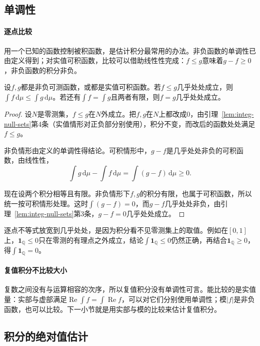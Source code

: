 \subsection{单调性}
\label{sec:integ-monotonicity}

\paragraph{逐点比较}
用一个已知的函数控制被积函数，是估计积分最常用的办法。非负函数的单调性已由定义得到；对实值可积函数，比较可以借助线性性完成：$f\leq g$意味着$g-f\geq0$，非负函数的积分非负。

\begin{theorem}[积分的单调性]
\label{thm:integ-monotonicity}
设$f,g$都是非负可测函数，或都是实值可积函数。若$f\leq g$几乎处处成立，则$\int f\,\mathrm d\mu\leq\int g\,\mathrm d\mu$。若还有$\int f=\int g$且两者有限，则$f=g$几乎处处成立。
\end{theorem}

\begin{proof}
设$N$是零测集，$f\leq g$在$N$外成立。把$f,g$在$N$上都改成$0$，由引理~\ref{lem:integ-null-sets}第4条（实值情形对正负部分别使用），积分不变，而改后的函数处处满足$f\leq g$。

非负情形由定义的单调性得结论。可积情形中，$g-f$是几乎处处非负的可积函数，由线性性，
\[
 \int g\,\mathrm d\mu-\int f\,\mathrm d\mu=\int(g-f)\,\mathrm d\mu\geq0 .
\]

现在设两个积分相等且有限。非负情形下$f,g$的积分有限，也属于可积函数，所以统一按可积情形处理。这时$\int(g-f)=0$，而$g-f$几乎处处非负，由引理~\ref{lem:integ-null-sets}第3条，$g-f=0$几乎处处成立。
\end{proof}

逐点不等式放宽到几乎处处，是因为积分看不见零测集上的取值。例如在$[0,1]$上，$\mathbf 1_{\mathbb Q}\leq0$只在零测的有理点之外成立，结论$\int\mathbf 1_{\mathbb Q}\leq0$仍然正确，再结合$\mathbf 1_{\mathbb Q}\geq0$，得$\int\mathbf 1_{\mathbb Q}=0$。

\paragraph{复值积分不比较大小}
复数之间没有与运算相容的次序，所以复值积分没有单调性可言。能比较的是实值量：实部与虚部满足$\operatorname{Re}\int f=\int\operatorname{Re}f$，可以对它们分别使用单调性；模$\lvert f\rvert$是非负函数，也可以比较。下一小节就是用实部与模的比较来估计复值积分。

\subsection{积分的绝对值估计}
\label{sec:integ-absolute-estimate}

